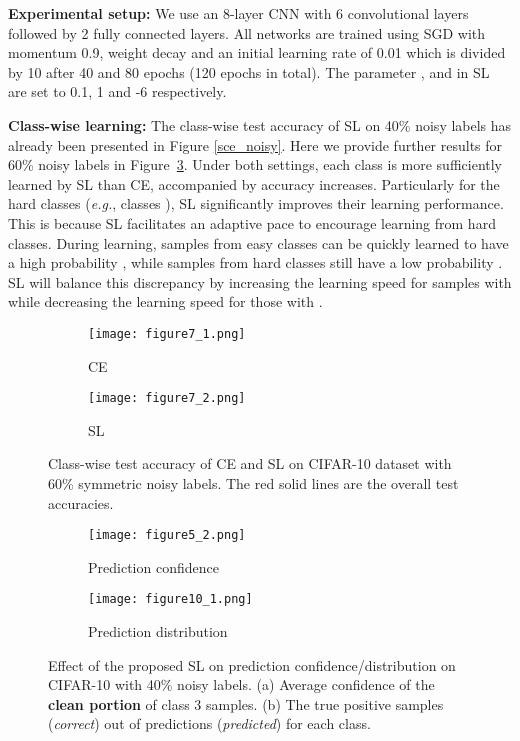 \documentclass[10pt,twocolumn,letterpaper]{article}
\begin{document}
\noindent\textbf{Experimental setup:} We use an 8-layer CNN with 6 convolutional layers followed by 2 fully connected layers. 
All networks are trained using SGD with momentum 0.9, weight decay  and an initial learning rate of 0.01 which is divided by 10 after 40 and 80 epochs (120 epochs in total). The parameter ,  and  in SL are set to 0.1, 1 and -6 respectively.

\noindent\textbf{Class-wise learning:} The class-wise test accuracy of SL on 40\% noisy labels has already been presented in Figure \ref{sce_noisy}. Here we provide further results for 60\% noisy labels in Figure~\ref{fig:ce_sce_test_acc_60}. Under both settings, each class is more sufficiently learned by SL than CE, accompanied by accuracy increases. Particularly for the hard classes (\textit{e.g.}, classes ), SL significantly improves their learning performance.
This is because SL facilitates an adaptive pace to encourage learning from hard classes. During learning, samples from easy classes can be quickly learned to have a high probability , while samples from hard classes still have a low probability . SL will balance this discrepancy by increasing the learning speed for samples with  while decreasing the learning speed for those with . 

\begin{figure}[!t]
	\centering
	\begin{subfigure}{0.49\linewidth}
		\texttt{[image: figure7\_1.png]}
		\caption{CE}
		\label{ce_test_acc}
	\end{subfigure}
	\begin{subfigure}{0.49\linewidth} 
		\texttt{[image: figure7\_2.png]}
		\caption{SL} 
		\label{sce_test_acc}
	\end{subfigure}
	\vspace{-0.1 in}
	\caption{Class-wise test accuracy of CE and SL on CIFAR-10 dataset with 60\% symmetric noisy labels. The red solid lines are the overall test accuracies.}
	\label{fig:ce_sce_test_acc_60}
	\vspace{-0.1 in}
\end{figure}


\begin{figure}[!t]
	\centering
	\begin{subfigure}{0.49\linewidth}
		\texttt{[image: figure5\_2.png]}
		\caption{Prediction confidence}
		\label{sce_confidence}
	\end{subfigure}
	\begin{subfigure}{0.49\linewidth}
		\texttt{[image: figure10\_1.png]}
		\caption{Prediction distribution} 
		\label{sce_prediction}
	\end{subfigure}
	\vspace{-0.1 in}
	\caption{Effect of the proposed SL on prediction confidence/distribution on CIFAR-10 with 40\% noisy labels. (a) Average confidence of the \textbf{clean portion} of class 3 samples. (b) The true positive samples (\emph{correct}) out of predictions (\emph{predicted}) for each class.}
	\label{fig:ce_sce_learning}
	\vspace{-0.1 in}
\end{figure}
\end{document}
